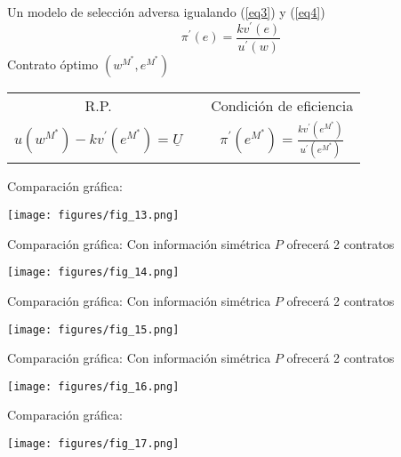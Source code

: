 \begin{frame}{Un modelo de selección adversa}
	igualando (\ref{eq3}) y (\ref{eq4})
		$$\pi^{\prime}(e) = \frac{kv^{\prime}(e)}{u^{\prime}(w)}$$
	Contrato óptimo $(w^{M^\ast},e^{M^\ast})$
		\begin{center}
			\begin{tabular}{ccc}
				R.P. &{}& Condición de eficiencia\\
				$u(w^{M^{*}}) - kv^{\prime}(e^{M^{*}}) = \underline{U}$&{}& $\pi^{\prime}(e^{M^{*}}) =\frac{kv^{\prime}(e^{M^{*}})}{u^{\prime}(e^{M^{*}})}$
			\end{tabular}
		\end{center}
\end{frame}
\begin{frame}{Comparación gráfica:}
	\begin{center}
		\texttt{[image: figures/fig\_13.png]}
	\end{center}
\end{frame}
\begin{frame}{Comparación gráfica:}
	Con información simétrica $P$ ofrecerá 2 contratos
	\begin{center}
		\texttt{[image: figures/fig\_14.png]}
	\end{center}
\end{frame}
\begin{frame}{Comparación gráfica:}
	Con información simétrica $P$ ofrecerá 2 contratos
	\begin{center}
		\texttt{[image: figures/fig\_15.png]}
	\end{center}
\end{frame}
\begin{frame}{Comparación gráfica:}
	Con información simétrica $P$ ofrecerá 2 contratos
	\begin{center}
		\texttt{[image: figures/fig\_16.png]}
	\end{center}
\end{frame}
\begin{frame}{Comparación gráfica:}
	\begin{center}
		\texttt{[image: figures/fig\_17.png]}
	\end{center}
\end{frame}
